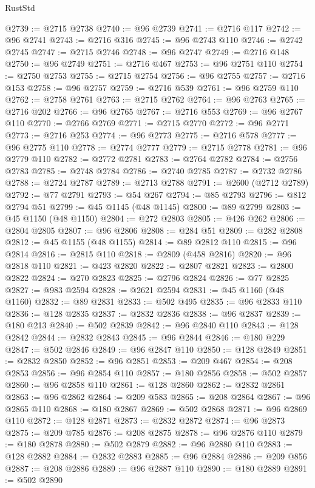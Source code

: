 \begin{lexlean}{RustStd}
\begin{coremodule}
@2739 := @2715 @2738
@2740 := @96 @2739
@2741 := @2716 @117
@2742 := @96 @2741
@2743 := @2716 @316
@2745 := @96 @2743 @110
@2746 := @2742 @2745
@2747 := @2715 @2746
@2748 := @96 @2747
@2749 := @2716 @148
@2750 := @96 @2749
@2751 := @2716 @467
@2753 := @96 @2751 @110
@2754 := @2750 @2753
@2755 := @2715 @2754
@2756 := @96 @2755
@2757 := @2716 @153
@2758 := @96 @2757
@2759 := @2716 @539
@2761 := @96 @2759 @110
@2762 := @2758 @2761
@2763 := @2715 @2762
@2764 := @96 @2763
@2765 := @2716 @202
@2766 := @96 @2765
@2767 := @2716 @553
@2769 := @96 @2767 @110
@2770 := @2766 @2769
@2771 := @2715 @2770
@2772 := @96 @2771
@2773 := @2716 @253
@2774 := @96 @2773
@2775 := @2716 @578
@2777 := @96 @2775 @110
@2778 := @2774 @2777
@2779 := @2715 @2778
@2781 := @96 @2779 @110
@2782 := @2772 @2781
@2783 := @2764 @2782
@2784 := @2756 @2783
@2785 := @2748 @2784
@2786 := @2740 @2785
@2787 := @2732 @2786
@2788 := @2724 @2787
@2789 := @2713 @2788
@2791 := @2600 (@2712 @2789)
@2792 := @77 @2791
@2793 := @54 @267
@2794 := @85 @2793
@2796 := @812 @2794 @51
@2799 := @45 @1145 (@48 @1145)
@2800 := @89 @2799
@2803 := @45 @1150 (@48 @1150)
@2804 := @272 @2803
@2805 := @426 @262
@2806 := @2804 @2805
@2807 := @96 @2806
@2808 := @284 @51
@2809 := @282 @2808
@2812 := @45 @1155 (@48 @1155)
@2814 := @89 @2812 @110
@2815 := @96 @2814
@2816 := @2815 @110
@2818 := @2809 (@458 @2816)
@2820 := @96 @2818 @110
@2821 := @423 @2820
@2822 := @2807 @2821
@2823 := @2800 @2822
@2824 := @270 @2823
@2825 := @2796 @2824
@2826 := @77 @2825
@2827 := @983 @2594
@2828 := @2621 @2594
@2831 := @45 @1160 (@48 @1160)
@2832 := @89 @2831
@2833 := @502 @495
@2835 := @96 @2833 @110
@2836 := @128 @2835
@2837 := @2832 @2836
@2838 := @96 @2837
@2839 := @180 @213
@2840 := @502 @2839
@2842 := @96 @2840 @110
@2843 := @128 @2842
@2844 := @2832 @2843
@2845 := @96 @2844
@2846 := @180 @229
@2847 := @502 @2846
@2849 := @96 @2847 @110
@2850 := @128 @2849
@2851 := @2832 @2850
@2852 := @96 @2851
@2853 := @209 @467
@2854 := @208 @2853
@2856 := @96 @2854 @110
@2857 := @180 @2856
@2858 := @502 @2857
@2860 := @96 @2858 @110
@2861 := @128 @2860
@2862 := @2832 @2861
@2863 := @96 @2862
@2864 := @209 @583
@2865 := @208 @2864
@2867 := @96 @2865 @110
@2868 := @180 @2867
@2869 := @502 @2868
@2871 := @96 @2869 @110
@2872 := @128 @2871
@2873 := @2832 @2872
@2874 := @96 @2873
@2875 := @209 @785
@2876 := @208 @2875
@2878 := @96 @2876 @110
@2879 := @180 @2878
@2880 := @502 @2879
@2882 := @96 @2880 @110
@2883 := @128 @2882
@2884 := @2832 @2883
@2885 := @96 @2884
@2886 := @209 @856
@2887 := @208 @2886
@2889 := @96 @2887 @110
@2890 := @180 @2889
@2891 := @502 @2890

\end{coremodule}
\end{lexlean}
